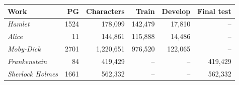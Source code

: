 \begin{tabular}{lrrrrr}\toprule
Work & PG & Characters & Train & Develop & Final test\\\midrule
\emph{Hamlet} & 1524 & 178,099 & 142,479 & 17,810 & -- \\
\emph{Alice} & 11 & 144,861 & 115,888 & 14,486 & -- \\
\emph{Moby-Dick} & 2701 & 1,220,651 & 976,520 & 122,065 & -- \\
\emph{Frankenstein} & 84 & 419,429 & -- & -- & 419,429 \\
\emph{Sherlock Holmes} & 1661 & 562,332 & -- & -- & 562,332 \\
\bottomrule\end{tabular}
